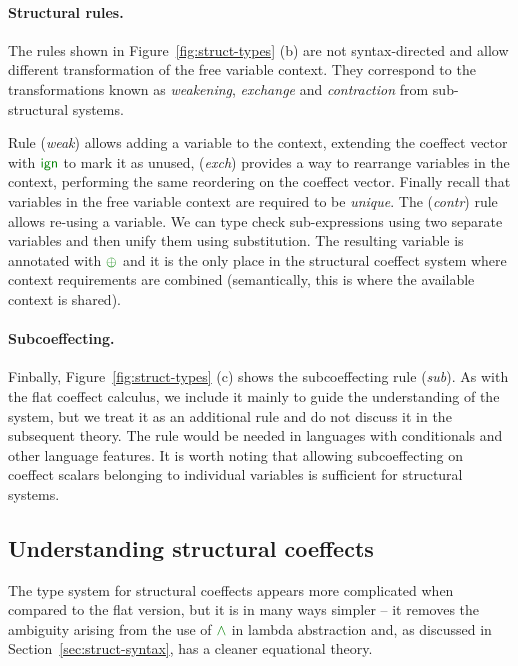 \paragraph{Structural rules.}
The rules shown in Figure~\ref{fig:struct-types} (b) are not syntax-directed and
allow different transformation of the free variable context. They correspond to the
transformations known as \emph{weakening}, \emph{exchange} and \emph{contraction}
from sub-structural systems.

Rule (\emph{weak}) allows adding a variable to the context, extending the coeffect
vector with $\czero$ to mark it as unused, (\emph{exch}) provides a way to rearrange variables
in the context, performing the same reordering on the coeffect vector. Finally recall that
variables in the free variable context are required to be \emph{unique}. The (\emph{contr}) rule
allows re-using a variable. We can type check sub-expressions using two separate variables and
then unify them using substitution. The resulting variable is annotated with $\cpar$ and it
is the only place in the structural coeffect system where context requirements are combined
(semantically, this is where the available context is shared).

\paragraph{Subcoeffecting.}
Finbally, Figure~\ref{fig:struct-types} (c) shows the subcoeffecting rule (\emph{sub}).
As with the flat coeffect calculus, we include it mainly to guide the understanding of the
system, but we treat it as an additional rule and do not discuss it in the subsequent theory.
The rule would be needed in languages with conditionals and other language features. It is
worth noting that allowing subcoeffecting on coeffect scalars belonging to individual variables
is sufficient for structural systems.


\subsection{Understanding structural coeffects}

The type system for structural coeffects appears more complicated when compared to the flat
version, but it is in many ways simpler -- it removes the ambiguity arising from the use
of $\czip$ in lambda abstraction and, as discussed in Section~\ref{sec:struct-syntax}, has
a cleaner equational theory.

